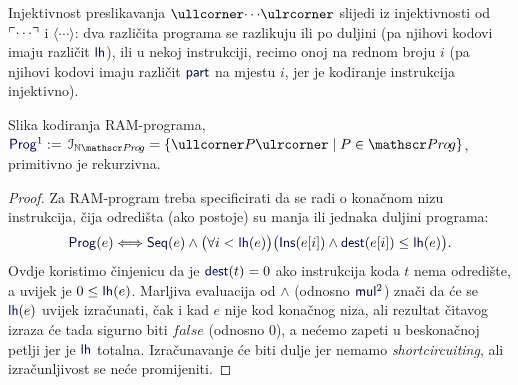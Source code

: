 Injektivnost preslikavanja $\kprog{\cdots}$ slijedi iz injektivnosti od $\ulcorner\cdots\urcorner$ i $\langle\cdots\rangle$: dva različita programa se razlikuju ili po duljini (pa njihovi kodovi imaju različit $\f{lh}$), ili u nekoj instrukciji, recimo onoj na rednom broju $i$ (pa njihovi kodovi imaju različit $\f{part}$ na mjestu $i$, jer je kodiranje instrukcija injektivno).

\begin{lema}[{name=[primitivna rekurzivnost slike kodiranja RAM-programa]}]
	Slika kodiranja RAM-programa, $\f{Prog}^1:=\,\im{\N\mathscr P\mspace{-1mu}r\mspace{-2mu}o\mspace{-2mu}g}=\{\kprog P\mid P\in\mathscr Pr\mspace{-1mu}o\mspace{-2mu}g\}$,\\ primitivno je rekurzivna.
\end{lema}
\begin{proof}
Za RAM-program treba specificirati da se radi o konačnom nizu instrukcija, čija odredišta (ako postoje) su manja ili jednaka duljini programa:
\begin{equation}\label{eq:Progget}
    \f{Prog}(e)\Longleftrightarrow\f{Seq}(e)\wedge\bigl(\forall i<\f{lh}(e)\bigr)\bigl(\f{Ins}(e[i])\land\f{dest}(e[i])\le \f{lh}(e)\bigr)\text.\\
\end{equation}
Ovdje koristimo činjenicu da je $\f{dest}(t)\eq0$ ako instrukcija koda $t$ nema od\-re\-di\-šte, a uvijek je $0\le\f{lh}(e)$. Marljiva evaluacija od $\land$ (odnosno $\f{mul}^2$) znači da će se $\f{lh}(e)$ uvijek izračunati, čak i kad $e$ nije kod konačnog niza, ali rezultat čitavog izraza će tada sigurno biti $\mathit{false}$ (odnosno $0$), a nećemo zapeti u beskonačnoj petlji jer je $\f{lh}$ totalna. Izračunavanje će biti dulje jer nemamo \emph{shortcircuiting}, ali izračunljivost se neće promijeniti.
\end{proof}




